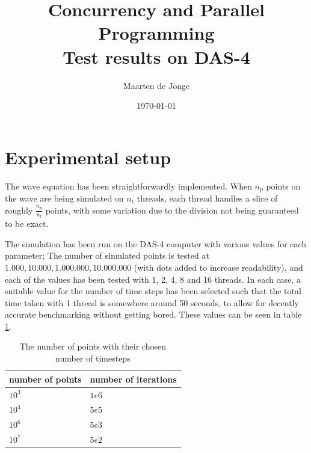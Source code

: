 \documentclass[a4paper]{article}
\author{Maarten de Jonge}
\date{\today}
\title{Concurrency and Parallel Programming \\
\large{Test results on DAS-4}}
\begin{document}
\maketitle

\section*{Experimental setup}
The wave equation has been straightforwardly implemented. When $n_p$ points on the
wave are being simulated on $n_t$ threads, each thread handles a slice of
roughly $\frac{n_p}{n_t}$ points, with some variation due to the division not
being guaranteed to be exact.

The simulation has been run on the DAS-4 computer with various values for each
parameter; The number of simulated points is tested at $1.000, 10.000,
1.000.000, 10.000.000$ (with dots added to increase readability), and each of
the values has been tested with 1, 2, 4, 8 and 16 threads. In each case, a
suitable value for the number of time steps has been selected such that the
total time taken with 1 thread is somewhere around 50 seconds, to allow for
decently accurate benchmarking without getting bored. These values can be seen
in table \ref{table:t}.

\begin{table}[htbp]
    \centering
    \begin{tabular}{|l|l|}
        \hline
        number of points & number of iterations \\
        \hline
        $10^3$ & $1e6$ \\
        $10^4$ & $5e5$ \\
        $10^6$ & $5e3$ \\
        $10^7$ & $5e2$ \\
        \hline
    \end{tabular}
    \caption{The number of points with their chosen number of timesteps}
    \label{table:t}
\end{table}
\end{document}
